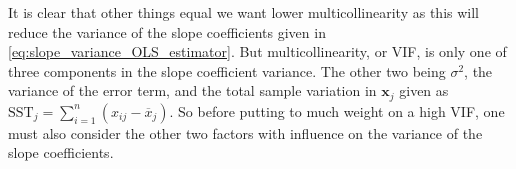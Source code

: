 It is clear that other things equal we want lower multicollinearity as this will reduce the variance of the slope coefficients given in \eqref{eq:slope_variance_OLS_estimator}.
But multicollinearity, or VIF, is only one of three components in the slope coefficient variance.
The other two being $\sigma^2$, the variance of the error term, and the total sample variation in $\textbf{x}_j$ given as $\text{SST}_j = \sum_{i=1}^n(x_{ij} - \overline{x}_j)$.
So before putting to much weight on a high VIF, one must also consider the other two factors with influence on the variance of the slope coefficients.